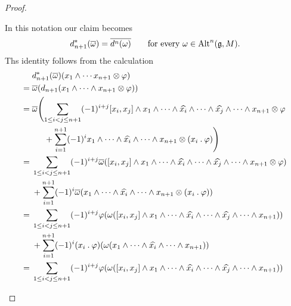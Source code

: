 \begin{proof}
\begin{enumerate}
      In this notation our claim becomes
      \begin{equation}
        \label{embedding of cochain complex into dual of chain complex}
        d_{n+1}^*( \overline{\omega} )
        =
        \overline{ d^n(\omega) }
        \qquad
        \text{for every~$\omega \in \operatorname{Alt}^n(\mathfrak{g}, M)$.}
      \end{equation}
      Ths identity follows from the calculation
      \begin{align*}
        {}&
        d_{n+1}^*( \overline{\omega} )(x_1 \wedge \dotsb x_{n+1} \otimes \varphi)
        \\
        ={}&
        \overline{\omega}( d_{n+1}( x_1 \wedge \dotsb \wedge x_{n+1} \otimes \varphi ) )
        \\
        ={}&
        \overline{\omega}
        \Biggl(
          \sum_{1 \leq i < j \leq n+1}
          (-1)^{i+j}
          [x_i, x_j] \wedge x_1 \wedge \dotsb \wedge \widehat{x_i} \wedge \dotsb \wedge \widehat{x_j} \wedge \dotsb \wedge x_{n+1} \otimes \varphi
        \\
        {}&
        \phantom{
          \omega
          \Biggl(
        }
          +
          \sum_{i=1}^{n+1}
          (-1)^i
          x_1 \wedge \dotsb \wedge \widehat{x_i} \wedge \dotsb \wedge x_{n+1} \otimes (x_i \act \varphi)
        \Biggr)
        \\
        ={}&
        \sum_{1 \leq i < j \leq n+1}
        (-1)^{i+j}
        \overline{\omega}
        (
          [x_i, x_j] \wedge x_1 \wedge \dotsb \wedge \widehat{x_i} \wedge \dotsb \wedge \widehat{x_j} \wedge \dotsb \wedge x_{n+1} \otimes \varphi
        )
        \\
        {}&
        +
        \sum_{i=1}^{n+1}
        (-1)^i
        \overline{\omega}
        (
          x_1 \wedge \dotsb \wedge \widehat{x_i} \wedge \dotsb \wedge x_{n+1} \otimes (x_i \act \varphi)
        )
        \\
        ={}&
        \sum_{1 \leq i < j \leq n+1}
        (-1)^{i+j}
        \varphi( \omega( [x_i, x_j] \wedge x_1 \wedge \dotsb \wedge \widehat{x_i} \wedge \dotsb \wedge \widehat{x_j} \wedge \dotsb \wedge x_{n+1} ) )
        \\
        {}&
        +
        \sum_{i=1}^{n+1}
        (-1)^i
        (x_i \act \varphi)( \omega( x_1 \wedge \dotsb \wedge \widehat{x_i} \wedge \dotsb \wedge x_{n+1} ) )
        \\
        ={}&
        \sum_{1 \leq i < j \leq n+1}
        (-1)^{i+j}
        \varphi( \omega( [x_i, x_j] \wedge x_1 \wedge \dotsb \wedge \widehat{x_i} \wedge \dotsb \wedge \widehat{x_j} \wedge \dotsb \wedge x_{n+1} ) )

\end{align*}
\end{enumerate}
\end{proof}
